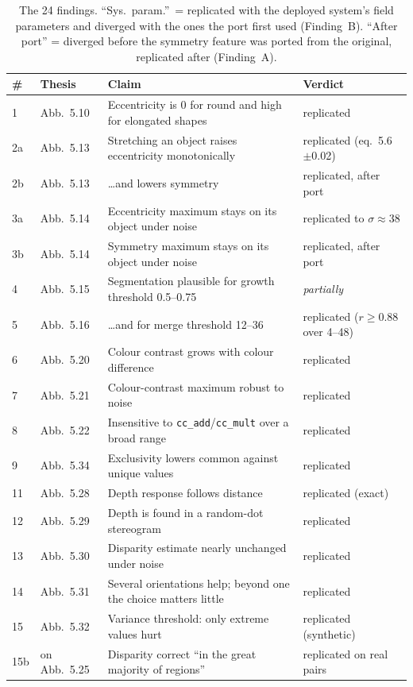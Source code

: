 \documentclass[11pt,a4paper]{article}
\begin{document}
\begin{table}[t]
\caption{The 24 findings. ``Sys.\ param.''\ = replicated with the deployed
system's field parameters and diverged with the ones the port first used
(Finding~B). ``After port'' = diverged before the symmetry feature was ported
from the original, replicated after (Finding~A).}
\label{tab:dossier}
\footnotesize
\begin{tabularx}{\linewidth}{@{}llXl@{}}
\toprule
\# & Thesis & Claim & Verdict \\
\midrule
1  & Abb.~5.10 & Eccentricity is 0 for round and high for elongated shapes & replicated \\
2a & Abb.~5.13 & Stretching an object raises eccentricity monotonically & replicated (eq.~5.6 $\pm$0.02) \\
2b & Abb.~5.13 & \ldots and lowers symmetry & replicated, after port \\
3a & Abb.~5.14 & Eccentricity maximum stays on its object under noise & replicated to $\sigma\approx38$ \\
3b & Abb.~5.14 & Symmetry maximum stays on its object under noise & replicated, after port \\
4  & Abb.~5.15 & Segmentation plausible for growth threshold 0.5--0.75 & \emph{partially} \\
5  & Abb.~5.16 & \ldots and for merge threshold 12--36 & replicated ($r\ge0.88$ over 4--48) \\
6  & Abb.~5.20 & Colour contrast grows with colour difference & replicated \\
7  & Abb.~5.21 & Colour-contrast maximum robust to noise & replicated \\
8  & Abb.~5.22 & Insensitive to \texttt{cc\_add}/\texttt{cc\_mult} over a broad range & replicated \\
9  & Abb.~5.34 & Exclusivity lowers common against unique values & replicated \\
11 & Abb.~5.28 & Depth response follows distance & replicated (exact) \\
12 & Abb.~5.29 & Depth is found in a random-dot stereogram & replicated \\
13 & Abb.~5.30 & Disparity estimate nearly unchanged under noise & replicated \\
14 & Abb.~5.31 & Several orientations help; beyond one the choice matters little & replicated \\
15 & Abb.~5.32 & Variance threshold: only extreme values hurt & replicated (synthetic) \\
15b& on Abb.~5.25 & Disparity correct ``in the great majority of regions'' & replicated on real pairs \\

\end{tabularx}
\end{table}
\end{document}
